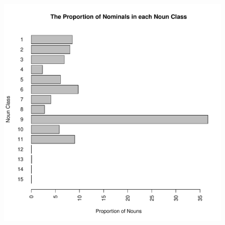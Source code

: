 \documentclass[12pt]{article}\usepackage[]{graphicx}\usepackage[]{color}
\makeatletter
\def\maxwidth{ %
  \ifdim\Gin@nat@width>\linewidth
    \linewidth
  \else
    \Gin@nat@width
  \fi
}
\makeatother
\begin{document}
\begin{figure}
\includegraphics[width=\maxwidth]{figure/Lexicostats3-1} \end{figure}
\end{document}
